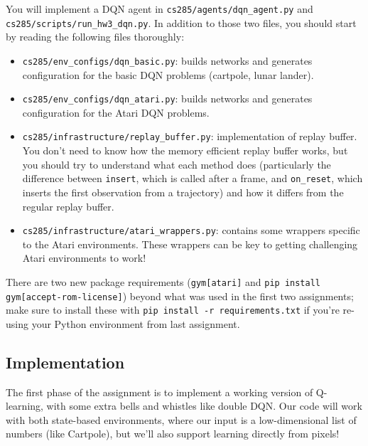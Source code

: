 You will implement a DQN agent in \verb|cs285/agents/dqn_agent.py| and \verb|cs285/scripts/run_hw3_dqn.py|. In addition to those two files, you should start by reading the following files thoroughly:
\begin{itemize}
    \item \verb|cs285/env_configs/dqn_basic.py|: builds networks and generates configuration for the basic DQN problems (cartpole, lunar lander).
    \item \verb|cs285/env_configs/dqn_atari.py|: builds networks and generates configuration for the Atari DQN problems.
    \item \verb|cs285/infrastructure/replay_buffer.py|: implementation of replay buffer. You don't need to know how the memory efficient replay buffer works, but you should try to understand what each method does (particularly the difference between \verb|insert|, which is called after a frame, and \verb|on_reset|, which inserts the first observation from a trajectory) and how it differs from the regular replay buffer.
    \item \verb|cs285/infrastructure/atari_wrappers.py|: contains some wrappers specific to the Atari environments. These wrappers can be key to getting challenging Atari environments to work!
\end{itemize}

There are two new package requirements (\texttt{gym[atari]} and \texttt{pip install gym[accept-rom-license]}) beyond what was used in the first two assignments; make sure to install these with \texttt{pip install -r requirements.txt} if you're re-using your Python environment from last assignment.

\subsection{Implementation}

The first phase of the assignment is to implement a working version of Q-learning, with some extra bells and whistles like double DQN. Our code will work with both state-based environments, where our input is a low-dimensional list of numbers (like Cartpole), but we'll also support learning directly from pixels!

